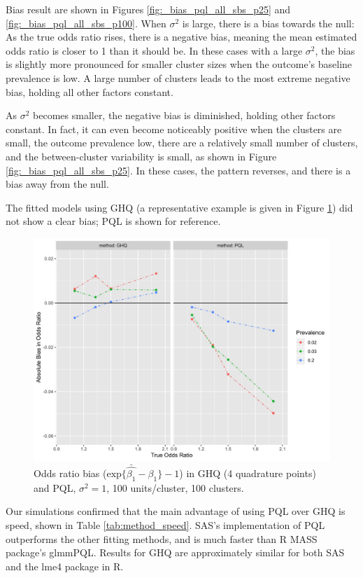 \documentclass[Afour,times,sagev,doublespace]{sagej}
\begin{document}
Bias result are shown in Figures \ref{fig:_bias_pql_all_sbs_p25} and \ref{fig:_bias_pql_all_sbs_p100}. When $\sigma^2$ is large, there is a bias towards the null: As the true odds ratio rises, there is a negative bias, meaning the mean estimated odds ratio is closer to 1 than it should be. In these cases with a large $\sigma^2$, the bias is slightly more pronounced for smaller cluster sizes when the outcome's baseline prevalence is low. A large number of clusters leads to the most extreme negative bias, holding all other factors constant.

As $\sigma^2$ becomes smaller, the negative bias is diminished, holding other factors constant. In fact, it can even become noticeably positive when the clusters are small, the outcome prevalence low, there are a relatively small number of clusters, and the between-cluster variability is small, as shown in Figure \ref{fig:_bias_pql_all_sbs_p25}. In these cases, the pattern reverses, and there is a bias away from the null.

The fitted models using GHQ (a representative example is given in Figure \ref{fig:_bias_pql_ghq4}) did not show a clear bias; PQL is shown for reference.

\begin{figure}
\centering
\includegraphics[width=\linewidth]{_bias_pql_ghq4.png}
  \caption{Odds ratio bias ($\text{exp} \{ \bar{\hat{\beta_1}} - \beta_1 \} - 1$) in GHQ (4 quadrature points) and PQL, $\sigma^2=1$, 100 units/cluster, 100 clusters.}
  \label{fig:_bias_pql_ghq4}
\end{figure}

Our simulations confirmed that the main advantage of using PQL over GHQ is speed, shown in Table \ref{tab:method_speed}. SAS's implementation of PQL outperforms the other fitting methods, and is much faster than R MASS package's glmmPQL. Results for GHQ are approximately similar for both SAS and the lme4 package in R.
\end{document}
